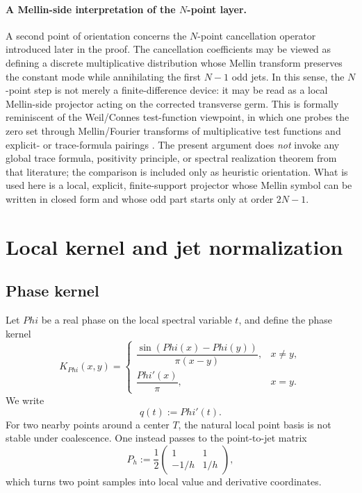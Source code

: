 \documentclass[11pt,a4paper]{amsart}
\def\Phi{Phi}%
\theoremstyle{plain}
\theoremstyle{definition}
\newcommand{\Ph}{\Phi}
\begin{document}
\paragraph{A Mellin-side interpretation of the $N$-point layer.}
A second point of orientation concerns the $N$-point cancellation operator
introduced later in the proof.  The cancellation coefficients may be viewed as
defining a discrete multiplicative distribution whose Mellin transform preserves
the constant mode while annihilating the first $N-1$ odd jets.  In this
sense, the $N$-point step is not merely a finite-difference device: it may be
read as a local Mellin-side projector acting on the corrected transverse germ.
This is formally reminiscent of the Weil/Connes test-function viewpoint, in
which one probes the zero set through Mellin/Fourier transforms of
multiplicative test functions and explicit- or trace-formula pairings
\cite{Conrey2003,Connes1997,ConnesConsani2021}.  The present argument does
\emph{not} invoke any global trace formula, positivity principle, or spectral
realization theorem from that literature; the comparison is included only as
heuristic orientation.  What is used here is a local, explicit, finite-support
projector whose Mellin symbol can be written in closed form and whose odd part
starts only at order $2N-1$.

\section{Local kernel and jet normalization}

\subsection{Phase kernel}

Let $\Ph$ be a real phase on the local spectral variable $t$, and define the phase kernel
\begin{equation}\label{eq:phase-kernel}
K_{\Ph}(x,y)=
\begin{cases}
\dfrac{\sin(\Ph(x)-\Ph(y))}{\pi(x-y)}, & x\neq y,\\[1ex]
\dfrac{\Ph'(x)}{\pi}, & x=y.
\end{cases}
\end{equation}
We write
\[
q(t):=\Ph'(t).
\]
For two nearby points around a center $T$, the natural local point basis is not stable under coalescence. One instead passes to the point-to-jet matrix
\begin{equation}\label{eq:point-to-jet}
P_h:=\frac12
\begin{pmatrix}
1 & 1\\[1ex]
-1/h & 1/h
\end{pmatrix},
\end{equation}
which turns two point samples into local value and derivative coordinates.
\end{document}
